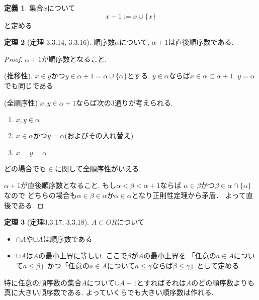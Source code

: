 \documentclass[dvipdfmx,a4paper,11pt]{article}
\theoremstyle{definition}
\newtheorem{thm}{定理}
\newtheorem{dfn}[thm]{定義}
\begin{document}
 \begin{tcolorbox}
 [colback = white, colframe = green!35!black, fonttitle = \bfseries,breakable = true]
\begin{dfn}
集合$x$について
$$
x + 1
:= 
x \cup \{ x\}
$$
と定める
\end{dfn}
\end{tcolorbox}

 \begin{tcolorbox}
 [colback = white, colframe = green!35!black, fonttitle = \bfseries,breakable = true]
\begin{thm}[定理 3.3.14, 3.3.16]
順序数$\alpha$について, $\alpha + 1$は直後順序数である.
\end{thm}
\end{tcolorbox}

\begin{proof}
$\alpha +1$が順序数となること.

(推移性). $x \in y$かつ$y\in \alpha + 1=\alpha\cup \{ \alpha\}$とする. 
$y \in \alpha$ならば$x \in \alpha \subset \alpha+1$. $y=\alpha$でも同じである.

(全順序性)
$x,y \in \alpha+1$ならば次の3通りが考えられる.
\begin{enumerate}
\item $x, y\in \alpha$
\item $x \in \alpha$かつ$y = \alpha $(およびその入れ替え)
\item $x = y= \alpha$
\end{enumerate}
どの場合でも$\in$に関して全順序性がいえる.

$\alpha +1$が直後順序数となること.
もし$\alpha < \beta < \alpha +1$ならば
$\alpha \in \beta$かつ$\beta \in \alpha \cap \{ \alpha\}$なので
どちらの場合も$\alpha \in \beta \in \alpha$か$\alpha \in \alpha$となり正則性定理から矛盾．
よって直後である. 
\end{proof}

 \begin{tcolorbox}
 [colback = white, colframe = green!35!black, fonttitle = \bfseries,breakable = true]
\begin{thm}[定理3.3.17, 3.3.18]
$A \subset OR$について
\begin{itemize}
\item $\cap A$や$\cup A$は順序数である
\item $\cup A$は$A$の最小上界に等しい. ここで$\beta$が$A$の最小上界を
「任意の$a\in A$について$a \le \beta$」かつ「任意の$a\in A$について$a \le \gamma$ならば$\beta \le \gamma$」として定める
\end{itemize}
特に任意の順序数の集合$A$について$\cup A +1$とすればそれは$A$のどの順序数よりも真に大きい順序数である. よっていくらでも大きい順序数は作れる. 
\end{thm}
\end{tcolorbox}
\end{document}
